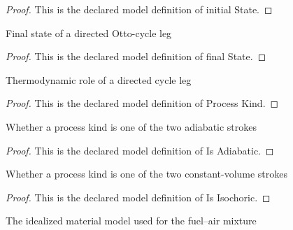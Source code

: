 \begin{proof}
  This is the declared model definition of initial State.
\end{proof}
\begin{definition}
  \label{def:physics:phyx-mini-0437:phyxminiproblems-problemphyxmini0437-cycleleg-finalstate}
  Final state of a directed Otto-cycle leg
\end{definition}
\begin{proof}
  This is the declared model definition of final State.
\end{proof}
\begin{definition}
  \label{def:physics:phyx-mini-0437:phyxminiproblems-problemphyxmini0437-processkind}
  Thermodynamic role of a directed cycle leg
\end{definition}
\begin{proof}
  This is the declared model definition of Process Kind.
\end{proof}
\begin{definition}[Is Adiabatic]
  \label{def:physics:phyx-mini-0437:phyxminiproblems-problemphyxmini0437-processkind-isadiabatic}
  Whether a process kind is one of the two adiabatic strokes
\end{definition}
\begin{proof}
  This is the declared model definition of Is Adiabatic.
\end{proof}
\begin{definition}[Is Isochoric]
  \label{def:physics:phyx-mini-0437:phyxminiproblems-problemphyxmini0437-processkind-isisochoric}
  Whether a process kind is one of the two constant-volume strokes
\end{definition}
\begin{proof}
  This is the declared model definition of Is Isochoric.
\end{proof}
\begin{definition}
  \label{def:physics:phyx-mini-0437:phyxminiproblems-problemphyxmini0437-workinggasmodel}
  The idealized material model used for the fuel--air mixture
\end{definition}
